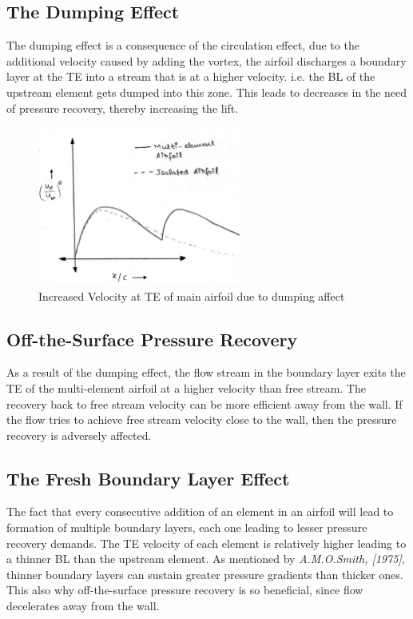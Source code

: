 \documentclass[main.tex]{subfiles}
\begin{document}
\subsection{The Dumping Effect} \label{dump}
The dumping effect is a consequence of the circulation effect, due to the additional velocity caused by adding the vortex, the airfoil discharges a boundary layer at the TE into a stream that is at a higher velocity. i.e. the BL of the upstream element gets dumped into this zone. This leads to decreases in the need of pressure recovery, thereby increasing the lift. 
\begin{figure}[h!]
\vspace*{-0.5em}\centering
\includegraphics[width=0.6\textwidth]{./Images/Ass4/Fig4}\vspace*{-1.3em}
\caption{Increased Velocity at TE of main airfoil due to dumping affect}\vspace*{-0.5em}
\label{Fig4}
\end{figure}\vspace*{-1.0em}

\subsection{Off-the-Surface Pressure Recovery}
As a result of the dumping effect, the flow stream in the boundary layer exits the TE of the multi-element airfoil at a higher velocity than free stream. The recovery back to free stream velocity can be more efficient away from the wall. If the flow tries to achieve free stream velocity close to the wall, then the pressure recovery is adversely affected.    

\subsection{The Fresh Boundary Layer Effect}
The fact that every consecutive addition of an element in an airfoil will lead to formation of multiple boundary layers, each one leading to lesser pressure recovery demands. The TE velocity of each element is relatively higher leading to a thinner BL than the upstream element. As mentioned by \textit{A.M.O.Smith, [1975]}\cite{highliftaero}, thinner boundary layers can sustain greater pressure gradients than thicker ones. This also why off-the-surface pressure recovery is so beneficial, since flow decelerates away from the wall.
\pagebreak
\end{document}
